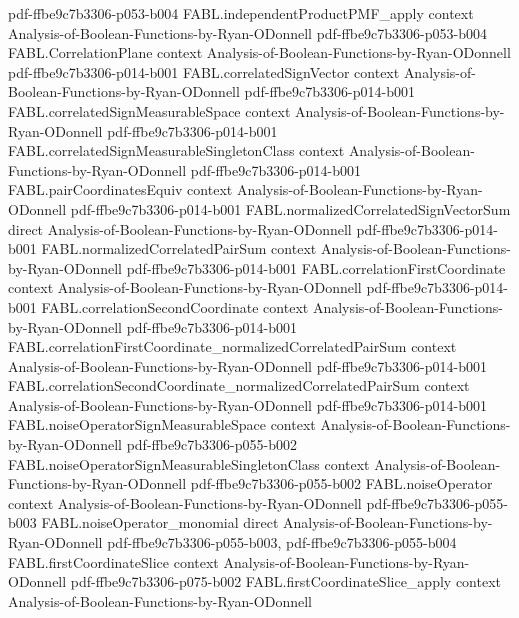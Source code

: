 \begin{theorem}
{    pdf-ffbe9c7b3306-p053-b004}
\proofstep
  {FABL.independentProductPMF_apply}
  {context}
  {Analysis-of-Boolean-Functions-by-Ryan-ODonnell}
  {pdf-ffbe9c7b3306-p053-b004}
\proofstep
  {FABL.CorrelationPlane}
  {context}
  {Analysis-of-Boolean-Functions-by-Ryan-ODonnell}
  {pdf-ffbe9c7b3306-p014-b001}
\proofstep
  {FABL.correlatedSignVector}
  {context}
  {Analysis-of-Boolean-Functions-by-Ryan-ODonnell}
  {pdf-ffbe9c7b3306-p014-b001}
\proofstep
  {FABL.correlatedSignMeasurableSpace}
  {context}
  {Analysis-of-Boolean-Functions-by-Ryan-ODonnell}
  {pdf-ffbe9c7b3306-p014-b001}
\proofstep
  {FABL.correlatedSignMeasurableSingletonClass}
  {context}
  {Analysis-of-Boolean-Functions-by-Ryan-ODonnell}
  {pdf-ffbe9c7b3306-p014-b001}
\proofstep
  {FABL.pairCoordinatesEquiv}
  {context}
  {Analysis-of-Boolean-Functions-by-Ryan-ODonnell}
  {pdf-ffbe9c7b3306-p014-b001}
\proofstep
  {FABL.normalizedCorrelatedSignVectorSum}
  {direct}
  {Analysis-of-Boolean-Functions-by-Ryan-ODonnell}
  {pdf-ffbe9c7b3306-p014-b001}
\proofstep
  {FABL.normalizedCorrelatedPairSum}
  {context}
  {Analysis-of-Boolean-Functions-by-Ryan-ODonnell}
  {pdf-ffbe9c7b3306-p014-b001}
\proofstep
  {FABL.correlationFirstCoordinate}
  {context}
  {Analysis-of-Boolean-Functions-by-Ryan-ODonnell}
  {pdf-ffbe9c7b3306-p014-b001}
\proofstep
  {FABL.correlationSecondCoordinate}
  {context}
  {Analysis-of-Boolean-Functions-by-Ryan-ODonnell}
  {pdf-ffbe9c7b3306-p014-b001}
\proofstep
  {FABL.correlationFirstCoordinate_normalizedCorrelatedPairSum}
  {context}
  {Analysis-of-Boolean-Functions-by-Ryan-ODonnell}
  {pdf-ffbe9c7b3306-p014-b001}
\proofstep
  {FABL.correlationSecondCoordinate_normalizedCorrelatedPairSum}
  {context}
  {Analysis-of-Boolean-Functions-by-Ryan-ODonnell}
  {pdf-ffbe9c7b3306-p014-b001}
\proofstep
  {FABL.noiseOperatorSignMeasurableSpace}
  {context}
  {Analysis-of-Boolean-Functions-by-Ryan-ODonnell}
  {pdf-ffbe9c7b3306-p055-b002}
\proofstep
  {FABL.noiseOperatorSignMeasurableSingletonClass}
  {context}
  {Analysis-of-Boolean-Functions-by-Ryan-ODonnell}
  {pdf-ffbe9c7b3306-p055-b002}
\proofstep
  {FABL.noiseOperator}
  {context}
  {Analysis-of-Boolean-Functions-by-Ryan-ODonnell}
  {pdf-ffbe9c7b3306-p055-b003}
\proofstep
  {FABL.noiseOperator_monomial}
  {direct}
  {Analysis-of-Boolean-Functions-by-Ryan-ODonnell}
  {pdf-ffbe9c7b3306-p055-b003,
    pdf-ffbe9c7b3306-p055-b004}
\proofstep
  {FABL.firstCoordinateSlice}
  {context}
  {Analysis-of-Boolean-Functions-by-Ryan-ODonnell}
  {pdf-ffbe9c7b3306-p075-b002}
\proofstep
  {FABL.firstCoordinateSlice_apply}
  {context}
  {Analysis-of-Boolean-Functions-by-Ryan-ODonnell}

\end{theorem}
